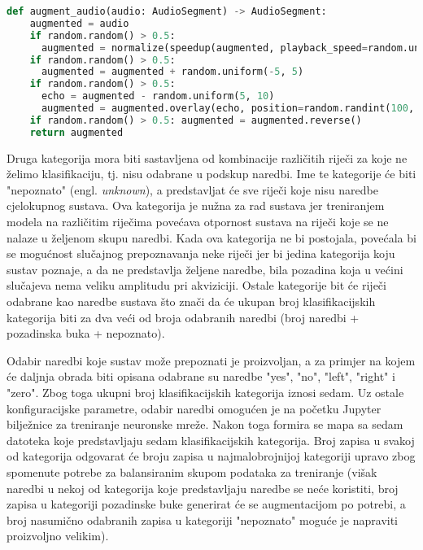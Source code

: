 \begin{lstlisting}[language=Python, caption=Augmentacija zvuka, label=code:augmentation]
def augment_audio(audio: AudioSegment) -> AudioSegment:
    augmented = audio
    if random.random() > 0.5:
      augmented = normalize(speedup(augmented, playback_speed=random.uniform(1.1, 1.5)))
    if random.random() > 0.5:
      augmented = augmented + random.uniform(-5, 5)
    if random.random() > 0.5:
      echo = augmented - random.uniform(5, 10) 
      augmented = augmented.overlay(echo, position=random.randint(100, 500))
    if random.random() > 0.5: augmented = augmented.reverse()
    return augmented
\end{lstlisting}


Druga kategorija mora biti sastavljena od kombinacije različitih riječi za koje
ne želimo klasifikaciju, tj. nisu odabrane u podskup naredbi. Ime te kategorije
će biti "nepoznato" (engl. \textit{unknown}), a predstavljat će sve riječi koje nisu
naredbe cjelokupnog sustava. Ova kategorija je nužna za rad sustava jer 
treniranjem modela na različitim riječima povećava otpornost sustava na riječi
koje se ne nalaze u željenom skupu naredbi. Kada ova kategorija ne bi postojala,
povećala bi se mogućnost slučajnog prepoznavanja neke riječi jer bi jedina kategorija
koju sustav poznaje, a da ne predstavlja željene naredbe, bila pozadina koja
u većini slučajeva nema veliku amplitudu pri akviziciji. 
Ostale kategorije bit će riječi odabrane kao naredbe
sustava što  znači da će ukupan broj klasifikacijskih kategorija biti za dva veći 
od broja odabranih naredbi (broj naredbi + pozadinska buka + nepoznato).

Odabir naredbi koje sustav može prepoznati je proizvoljan, a za primjer na kojem
će daljnja obrada biti opisana odabrane su naredbe "yes", "no", "left", "right" i 
"zero". Zbog toga ukupni broj
klasifikacijskih kategorija iznosi sedam. Uz ostale konfiguracijske parametre,
odabir naredbi omogućen je na početku Jupyter bilježnice za treniranje neuronske mreže.
Nakon toga formira se mapa sa sedam datoteka koje predstavljaju sedam klasifikacijskih
kategorija.
Broj zapisa u svakoj od kategorija odgovarat će broju zapisa u najmalobrojnijoj 
kategoriji upravo zbog spomenute potrebe za balansiranim skupom podataka za treniranje
(višak naredbi u nekoj od kategorija koje predstavljaju naredbe se neće koristiti, broj
zapisa u kategoriji pozadinske buke generirat će se augmentacijom po potrebi, a broj
nasumično odabranih zapisa u kategoriji "nepoznato" moguće je napraviti proizvoljno
velikim).

